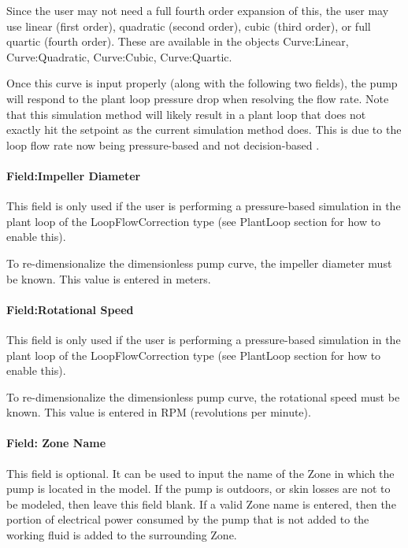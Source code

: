 Since the user may not need a full fourth order expansion of this, the user may use linear (first order), quadratic (second order), cubic (third order), or full quartic (fourth order). These are available in the objects Curve:Linear, Curve:Quadratic, Curve:Cubic, Curve:Quartic.

Once this curve is input properly (along with the following two fields), the pump will respond to the plant loop pressure drop when resolving the flow rate. Note that this simulation method will likely result in a plant loop that does not exactly hit the setpoint as the current simulation method does. This is due to the loop flow rate now being pressure-based and not decision-based .

\paragraph{Field:Impeller Diameter}\label{fieldimpeller-diameter}

This field is only used if the user is performing a pressure-based simulation in the plant loop of the LoopFlowCorrection type (see PlantLoop section for how to enable this).

To re-dimensionalize the dimensionless pump curve, the impeller diameter must be known. This value is entered in meters.

\paragraph{Field:Rotational Speed}\label{fieldrotational-speed}

This field is only used if the user is performing a pressure-based simulation in the plant loop of the LoopFlowCorrection type (see PlantLoop section for how to enable this).

To re-dimensionalize the dimensionless pump curve, the rotational speed must be known. This value is entered in RPM (revolutions per minute).

\paragraph{Field: Zone Name}\label{field-zone-name-1-006}

This field is optional. It can be used to input the name of the Zone in which the pump is located in the model. If the pump is outdoors, or skin losses are not to be modeled, then leave this field blank. If a valid Zone name is entered, then the portion of electrical power consumed by the pump that is not added to the working fluid is added to the surrounding Zone.

